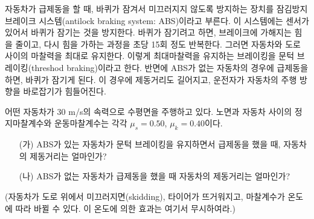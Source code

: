 \documentclass[floatfix,nofootinbib,superscriptaddress,fleqn,preprint]{revtex4}
\begin{document}
 자동차가 급제동을 할 때, 바퀴가
잠겨서 미끄러지지 않도록 방지하는 장치를 잠김방지 브레이크
시스템(antilock braking system: ABS)이라고 부른다. 이 시스템에는
센서가 있어서 바퀴가 잠기는 것을 방지한다. 바퀴가 잠기려고 하면,
브레이크에 가해지는 힘을 줄이고, 다시 힘을 가하는 과정을 초당 15회
정도 반복한다. 그러면 자동차와 도로 사이의 마찰력을 최대로
유지한다. 이렇게 최대마찰력을 유지하는 브레이킹을 문턱
브레이킹(threshod braking)이라고 한다.
반면에 ABS가 없는 자동차의 경우에 급제동을 하면, 바퀴가
잠기게 된다. 이 경우에 제동거리도 길어지고, 운전자가 자동차의 주행
방향을 바로잡기가 힘들어진다.

어떤 자동차가 30 m/s의 속력으로 수평면을 주행하고 있다. 노면과 자동차
사이의 정지마찰계수와 운동마찰계수는 각각 $\mu_s=0.50$,
$\mu_k=0.40$이다. 
\begin{itemize}
\item[(가)] ABS가 있는 자동차가 문턱 브레이킹을 유지하면서 급제동을
  했을 때, 자동차의 제동거리는 얼마인가?
\item[(나)] ABS가 없는 자동차가 급제동을 했을 때 자동차의 제동거리는
  얼마인가?   
\end{itemize}
(자동차가 도로 위에서 미끄러지면(skidding), 타이어가 뜨거워지고,
마찰계수가 온도에 따라 바뀔 수 있다. 이 온도에 의한 효과는 여기서 무시하여라.)
\end{document}
